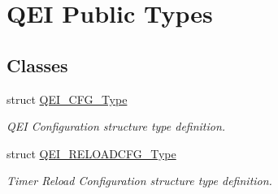 \hypertarget{group___q_e_i___public___types}{\section{\-Q\-E\-I \-Public \-Types}
\label{group___q_e_i___public___types}
}
\subsection*{\-Classes}
\begin{DoxyCompactItemize}
\item 
struct \hyperlink{struct_q_e_i___c_f_g___type}{\-Q\-E\-I\-\_\-\-C\-F\-G\-\_\-\-Type}
\begin{DoxyCompactList}\small\item\em \-Q\-E\-I \-Configuration structure type definition. \end{DoxyCompactList}\item 
struct \hyperlink{struct_q_e_i___r_e_l_o_a_d_c_f_g___type}{\-Q\-E\-I\-\_\-\-R\-E\-L\-O\-A\-D\-C\-F\-G\-\_\-\-Type}
\begin{DoxyCompactList}\small\item\em \-Timer \-Reload \-Configuration structure type definition. \end{DoxyCompactList}\end{DoxyCompactItemize}
